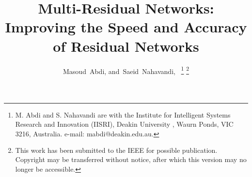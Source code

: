 \documentclass[journal]{IEEEtran}
\begin{document}
%
\title{Multi-Residual Networks: Improving the Speed and Accuracy of Residual Networks}
%
%
%

\author{Masoud~Abdi,
        and~Saeid~Nahavandi,~%
\thanks{M. Abdi and S. Nahavandi are with the Institute for Intelligent Systems Research and Innovation (IISRI), Deakin University , Waurn Ponds,
VIC 3216, Australia. e-mail: mabdi@deakin.edu.au.
}
\thanks{This work has been submitted to the IEEE for possible publication. Copyright may be transferred without notice, after which this version may no longer be accessible.}%
}

% 
%
\end{document}
